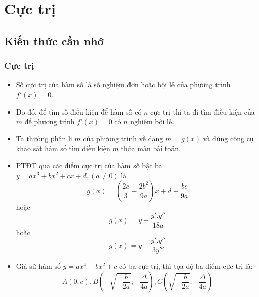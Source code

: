 \section{Cực trị}
\subsection{Kiến thức cần nhớ}
\begin{khung}
	\subsubsection{Cực trị}
	\begin{itemize}
		\item Số cực trị của hàm số là số nghiệm đơn hoặc bội lẻ của phương trình $f'(x)=0$.
		\item Do đó, để tìm số điều kiện để hàm số có $n$ cực trị thì ta đi tìm điều kiện của $m$  để phương trình $f'(x)=0$ có $n$ nghiệm bội lẻ.
		\item Ta thường phân li $m$ của phương trình về dạng $m=g(x)$ và dùng công cụ khảo sát hàm số tìm điều kiện $m$ thỏa mãn bài toán.
		\item PTĐT qua các điểm cực trị của hàm số bậc ba $y=ax^3+bx^2+cx+d,(a\ne 0 )$ là $$g(x)=\left( \dfrac{2c}{3}-\dfrac{2{{b}^{2}}}{9a} \right)x+d-\dfrac{bc}{9a} $$
		hoặc  $$ g( x )=y-\frac{{y}'.{y}''}{18a}$$
		 hoặc  $$g( x )=y-\frac{{y}'.{y}''}{3{y}'''}$$
		\item Giả sử hàm số $y=a{{x}^{4}}+b{{x}^{2}}+c$ có ba cực trị, thì tọa độ ba điểm cực trị là:
		$$A(0;c),B\left( -\sqrt{-\frac{b}{2a}};-\frac{\Delta }{4a} \right),C\left( \sqrt{-\frac{b}{2a}};-\frac{\Delta }{4a} \right)$$
		\end{itemize}
\end{khung}
